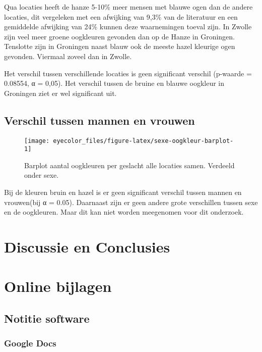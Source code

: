 \documentclass[
]{article}
\begin{document}
Qua locaties heeft de hanze 5-10\% meer mensen met blauwe ogen dan de
andere locaties, dit vergeleken met een afwijking van 9,3\% van de
literatuur en een gemiddelde afwijking van 24\% kunnen deze waarnemingen
toeval zijn. In Zwolle zijn veel meer groene oogkleuren gevonden dan op
de Hanze in Groningen. Tenslotte zijn in Groningen naast blauw ook de
meeste hazel kleurige ogen gevonden. Viermaal zoveel dan in Zwolle.

Het verschil tussen verschillende locaties is geen significant verschil
(p-waarde = 0.08554, α = 0,05). Het verschil tussen de bruine en blauwe
oogkleur in Groningen ziet er wel significant uit.

\hypertarget{verschil-tussen-mannen-en-vrouwen}{%
\subsection{Verschil tussen mannen en vrouwen}\label{verschil-tussen-mannen-en-vrouwen}}

\begin{figure}
\texttt{[image: eyecolor\_files/figure-latex/sexe-oogkleur-barplot-1]} \caption{Barplot aantal oogkleuren per geslacht alle locaties samen. Verdeeld onder sexe.}\label{fig:sexe-oogkleur-barplot}
\end{figure}

Bij de kleuren bruin en hazel is er geen significant verschil tussen
mannen en vrouwen(bij α = 0.05). Daarnaast zijn er geen andere grote
verschillen tussen sexe en de oogkleuren. Maar dit kan niet worden
meegenomen voor dit onderzoek.

\hypertarget{discussie-en-conclusies}{%
\section{Discussie en Conclusies}\label{discussie-en-conclusies}}

\hypertarget{online-bijlagen}{%
\section{Online bijlagen}\label{online-bijlagen}}

\hypertarget{notitie-software}{%
\subsection{Notitie software}\label{notitie-software}}

\hypertarget{g-docs}{%
\subsubsection{Google Docs}\label{g-docs}}
\end{document}
